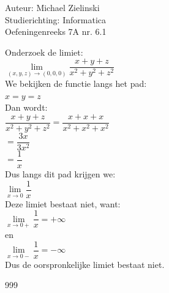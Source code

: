 \documentclass[a4paper]{article}
\begin{document}
\normalsize

\noindent \large Auteur: Michael Zielinski \\
\noindent \large Studierichting: Informatica \\
\noindent \large Oefeningenreeks 7A nr. 6.1 \\

\medskip

\normalsize

Onderzoek de limiet: \\

$ \lim\limits_{(x,y,z)\to(0,0,0)} \dfrac{x+y+z}{x^2+y^2+z^2} $ \\

We bekijken de functie langs het pad: \\

$ x=y=z $ \\

Dan wordt: \\

$ \dfrac{x+y+z}{x^2+y^2+z^2}
= \dfrac{x+x+x}{x^2+x^2+x^2} $ \\

$ = \dfrac{3x}{3x^2} $ \\

$ = \dfrac{1}{x} $ \\

Dus langs dit pad krijgen we: \\

$ \lim\limits_{x\to 0}\dfrac{1}{x} $ \\

Deze limiet bestaat niet, want: \\

$ \lim\limits_{x\to 0+}\dfrac{1}{x}=+\infty $ \\

en \\

$ \lim\limits_{x\to 0-}\dfrac{1}{x}=-\infty $ \\

Dus de oorspronkelijke limiet bestaat niet. \\

\begin{thebibliography}{999}
\end{thebibliography}
\end{document}
